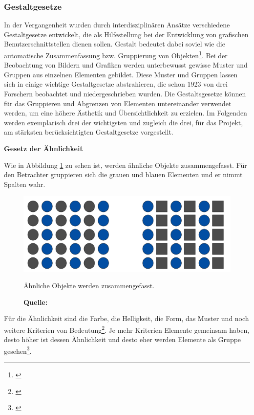 
\subsubsection{Gestaltgesetze}
\label{sec:gestaltgesetze}
In der Vergangenheit wurden durch interdisziplinären Ansätze verschiedene Gestaltgesetze entwickelt, die als Hilfestellung bei der Entwicklung von grafischen Benutzerschnittstellen dienen sollen. Gestalt bedeutet dabei soviel wie die automatische Zusammenfassung bzw. Gruppierung von Objekten\footnote{\cite[vgl.][59]{Dahm2006}}. Bei der Beobachtung von Bildern und Grafiken werden unterbewusst gewisse Muster und Gruppen aus einzelnen Elementen gebildet. Diese Muster und Gruppen lassen sich in einige wichtige Gestaltgesetze abstrahieren, die schon 1923 von drei Forschern beobachtet und niedergeschrieben wurden. Die Gestaltsgesetze können für das Gruppieren und Abgrenzen von Elementen untereinander verwendet werden, um eine höhere Ästhetik und Übersichtlichkeit zu erzielen. Im Folgenden werden exemplarisch drei der wichtigsten und zugleich die drei, für das Projekt, am stärksten berücksichtigten Gestaltgesetze vorgestellt.

\textbf{Gesetz der Ähnlichkeit}

Wie in Abbildung \ref{fig:aehnlichkeit} zu sehen ist, werden ähnliche Objekte zusammengefasst. Für den Betrachter gruppieren sich die grauen und blauen Elementen und er nimmt Spalten wahr.
\begin{figure}[H]
  \centering
  \includegraphics[scale=0.8]{img/gesetz_der_Aehnlichkeit.PNG}
  \caption{Ähnliche Objekte werden zusammengefasst.}
    \caption*{\textbf{Quelle:} \cite[59]{Dahm2006}}
  \label{fig:aehnlichkeit}
\end{figure}
Für die Ähnlichkeit sind die Farbe, die Helligkeit, die Form, das Muster und noch weitere Kriterien von Bedeutung\footnote{\cite[vgl.][59f]{Dahm2006}}. Je mehr Kriterien Elemente gemeinsam haben, desto höher ist dessen Ähnlichkeit und desto eher werden Elemente als Gruppe gesehen\footnote{\cite[vgl.][]{HTMLSeminarDe}}.

